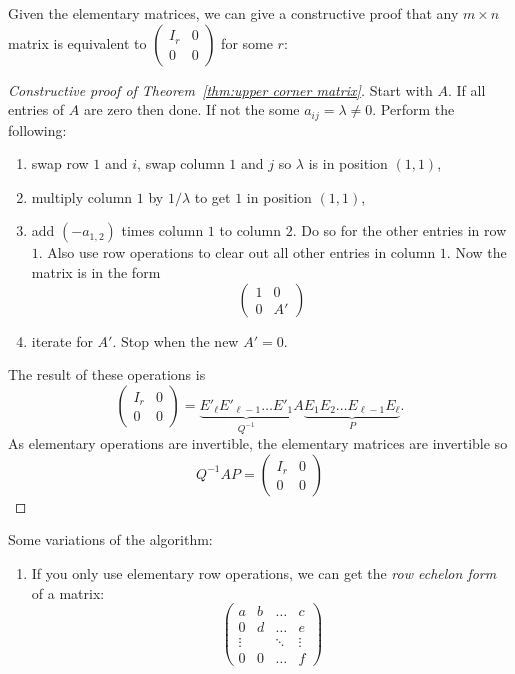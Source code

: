 \documentclass[a4paper]{article}
\theoremstyle{definition}
\begin{document}
Given the elementary matrices, we can give a constructive proof that any \(m\times n\) matrix is equivalent to \(\begin{pmatrix} I_r & 0 \\ 0 & 0 \end{pmatrix}\) for some \(r\):

\begin{proof}[Constructive proof of Theorem~\ref{thm:upper corner matrix}]
  Start with \(A\). If all entries of \(A\) are zero then done. If not the some \(a_{ij} = \lambda \neq 0\). Perform the following:
  \begin{enumerate}
  \item swap row \(1\) and \(i\), swap column \(1\) and \(j\) so \(\lambda\) is in position \((1,1)\),
  \item multiply column \(1\) by \(1/\lambda\) to get \(1\) in position \((1,1)\),
  \item add \((-a_{1,2})\) times column \(1\) to column \(2\). Do so for the other entries in row \(1\). Also use row operations to clear out all other entries in column \(1\). Now the matrix is in the form
    \[
      \begin{pmatrix}
        1 & 0 \\
        0 & A'
      \end{pmatrix}
    \]
  \item iterate for \(A'\). Stop when the new \(A' = 0\).
  \end{enumerate}
  The result of these operations is
  \[
    \begin{pmatrix}
      I_r & 0 \\
      0 & 0
    \end{pmatrix}
    =\underbrace{E'_{\ell}E'_{\ell-1}\dots E'_1}_{Q^{-1}} A \underbrace{E_1E_2\dots E_{\ell-1}E_\ell}_{P}.
  \]
  As elementary operations are invertible, the elementary matrices are invertible so
  \[
    Q^{-1}AP = 
     \begin{pmatrix}
      I_r & 0 \\
      0 & 0
    \end{pmatrix}
  \]
\end{proof}

Some variations of the algorithm:
\begin{enumerate}
\item If you only use elementary row operations, we can get the \emph{row echelon form} of a matrix:
  \[
    \begin{pmatrix}
      a & b & \dots & c \\
      0 & d & \dots & e \\
      \vdots & & \ddots & \vdots \\
      0 & 0 & \dots & f 
    \end{pmatrix}
  \]
\end{enumerate}
\end{document}
